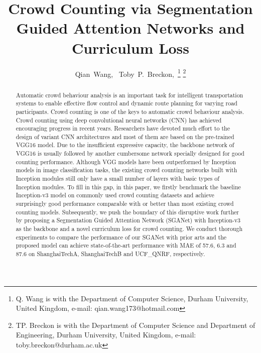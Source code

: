 \documentclass[journal,comsoc]{IEEEtran}
\begin{document}
\title{Crowd Counting via Segmentation Guided Attention Networks and Curriculum Loss}
\author{Qian~Wang,~
        Toby~P.~Breckon,~\thanks{Q. Wang is with the Department
of Computer Science, Durham University, United Kingdom, e-mail: qian.wang173@hotmail.com}
\thanks{TP. Breckon is with the Department of Computer Science and Department of Engineering, Durham University, United Kingdom, e-mail: toby.breckon@durham.ac.uk}}

\maketitle

\begin{abstract}
   Automatic crowd behaviour analysis is an important task for intelligent transportation systems to enable effective flow control and dynamic route planning for varying road participants. Crowd counting is one of the keys to automatic crowd behaviour analysis.
   Crowd counting using deep convolutional neural networks (CNN) has achieved encouraging progress in recent years. Researchers have devoted much effort to the design of variant CNN architectures and most of them are based on the pre-trained VGG16 model. Due to the insufficient expressive capacity, the backbone network of VGG16 is usually followed by another cumbersome network specially designed for good counting performance. Although VGG models have been outperformed by Inception models in image classification tasks, the existing crowd counting networks built with Inception modules still only have a small number of layers with basic types of Inception modules. To fill in this gap, in this paper, we firstly benchmark the baseline Inception-v3 model on commonly used crowd counting datasets and achieve surprisingly good performance comparable with or better than most existing crowd counting models. Subsequently, we push the boundary of this disruptive work further by proposing a Segmentation Guided Attention Network (SGANet) with Inception-v3 as the backbone and a novel curriculum loss for crowd counting. We conduct thorough experiments to compare the performance of our SGANet with prior arts and the proposed model can achieve state-of-the-art performance with MAE of 57.6, 6.3 and 87.6 on ShanghaiTechA, ShanghaiTechB and UCF\_QNRF, respectively.
\end{abstract}
\end{document}
